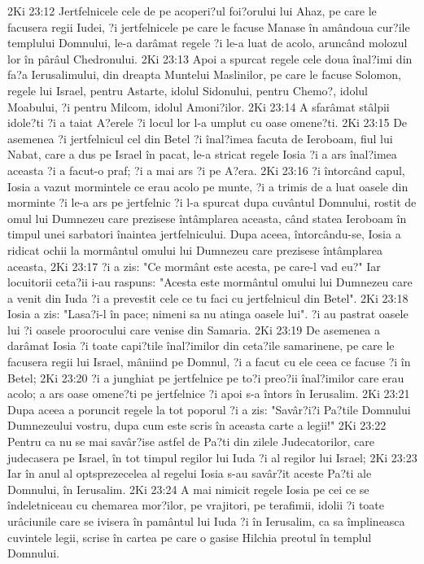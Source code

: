 2Ki 23:12  Jertfelnicele cele de pe acoperi?ul foi?orului lui Ahaz, pe care le facusera regii Iudei, ?i jertfelnicele pe care le facuse Manase în amândoua cur?ile templului Domnului, le-a darâmat regele ?i le-a luat de acolo, aruncând molozul lor în pârâul Chedronului.
2Ki 23:13  Apoi a spurcat regele cele doua înal?imi din fa?a Ierusalimului, din dreapta Muntelui Maslinilor, pe care le facuse Solomon, regele lui Israel, pentru Astarte, idolul Sidonului, pentru Chemo?, idolul Moabului, ?i pentru Milcom, idolul Amoni?ilor.
2Ki 23:14  A sfarâmat stâlpii idole?ti ?i a taiat A?erele ?i locul lor l-a umplut cu oase omene?ti.
2Ki 23:15  De asemenea ?i jertfelnicul cel din Betel ?i înal?imea facuta de Ieroboam, fiul lui Nabat, care a dus pe Israel în pacat, le-a stricat regele Iosia ?i a ars înal?imea aceasta ?i a facut-o praf; ?i a mai ars ?i pe A?era.
2Ki 23:16  ?i întorcând capul, Iosia a vazut mormintele ce erau acolo pe munte, ?i a trimis de a luat oasele din morminte ?i le-a ars pe jertfelnic ?i l-a spurcat dupa cuvântul Domnului, rostit de omul lui Dumnezeu care prezisese întâmplarea aceasta, când statea Ieroboam în timpul unei sarbatori înaintea jertfelnicului. Dupa aceea, întorcându-se, Iosia a ridicat ochii la mormântul omului lui Dumnezeu care prezisese întâmplarea aceasta,
2Ki 23:17  ?i a zis: "Ce mormânt este acesta, pe care-l vad eu?" Iar locuitorii ceta?ii i-au raspuns: "Acesta este mormântul omului lui Dumnezeu care a venit din Iuda ?i a prevestit cele ce tu faci cu jertfelnicul din Betel".
2Ki 23:18  Iosia a zis: "Lasa?i-l în pace; nimeni sa nu atinga oasele lui". ?i au pastrat oasele lui ?i oasele proorocului care venise din Samaria.
2Ki 23:19  De asemenea a darâmat Iosia ?i toate capi?tile înal?imilor din ceta?ile samarinene, pe care le facusera regii lui Israel, mâniind pe Domnul, ?i a facut cu ele ceea ce facuse ?i în Betel;
2Ki 23:20  ?i a junghiat pe jertfelnice pe to?i preo?ii înal?imilor care erau acolo; a ars oase omene?ti pe jertfelnice ?i apoi s-a întors în Ierusalim.
2Ki 23:21  Dupa aceea a poruncit regele la tot poporul ?i a zis: "Savâr?i?i Pa?tile Domnului Dumnezeului vostru, dupa cum este scris în aceasta carte a legii!"
2Ki 23:22  Pentru ca nu se mai savâr?ise astfel de Pa?ti din zilele Judecatorilor, care judecasera pe Israel, în tot timpul regilor lui Iuda ?i al regilor lui Israel;
2Ki 23:23  Iar în anul al optsprezecelea al regelui Iosia s-au savâr?it aceste Pa?ti ale Domnului, în Ierusalim.
2Ki 23:24  A mai nimicit regele Iosia pe cei ce se îndeletniceau cu chemarea mor?ilor, pe vrajitori, pe terafimii, idolii ?i toate urâciunile care se ivisera în pamântul lui Iuda ?i în Ierusalim, ca sa împlineasca cuvintele legii, scrise în cartea pe care o gasise Hilchia preotul în templul Domnului.
